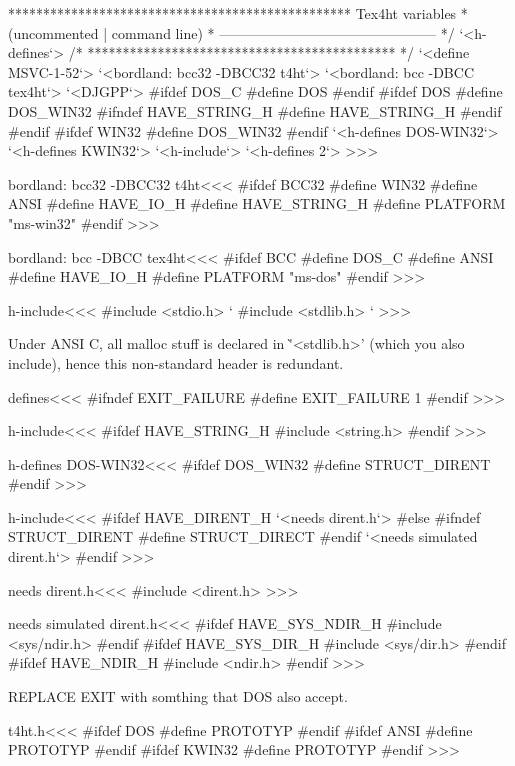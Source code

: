 {*************************************************
    Tex4ht variables                            *
    (uncommented | command line)                *
----------------------------------------------- */
`<h-defines`>
/* ******************************************** */
`<define MSVC-1-52`>
`<bordland: bcc32 -DBCC32 t4ht`>
`<bordland: bcc -DBCC tex4ht`>
`<DJGPP`>
#ifdef DOS_C
#define DOS
#endif
#ifdef DOS
#define DOS_WIN32
#ifndef HAVE_STRING_H
#define HAVE_STRING_H
#endif
#endif
#ifdef WIN32
#define DOS_WIN32
#endif
`<h-defines DOS-WIN32`>
`<h-defines KWIN32`>
`<h-include`>
`<h-defines 2`>
>>>


\<bordland: bcc32 -DBCC32 t4ht\><<<
#ifdef BCC32
#define WIN32 
#define ANSI       
#define HAVE_IO_H
#define HAVE_STRING_H
#define PLATFORM "ms-win32"
#endif
>>>

% 

\<bordland: bcc -DBCC tex4ht\><<<
#ifdef BCC
#define DOS_C
#define ANSI       
#define HAVE_IO_H
#define PLATFORM "ms-dos"
#endif
>>>


\<h-include\><<<
#include <stdio.h>   `%
#include <stdlib.h>  `%
>>>



  Under ANSI C, all malloc stuff is declared in \`'<stdlib.h>' (which you
also include), hence this non-standard header is redundant.



\<defines\><<<
#ifndef EXIT_FAILURE
#define EXIT_FAILURE 1
#endif
>>>

\<h-include\><<<
#ifdef HAVE_STRING_H
#include <string.h>
#endif
>>>




\<h-defines DOS-WIN32\><<<
#ifdef DOS_WIN32
#define STRUCT_DIRENT
#endif
>>>


\<h-include\><<<
#ifdef HAVE_DIRENT_H
`<needs dirent.h`>
#else
#ifndef STRUCT_DIRENT
#define STRUCT_DIRECT
#endif
`<needs simulated dirent.h`>
#endif 
>>>



\<needs dirent.h\><<<
#include <dirent.h>
>>>


\<needs simulated dirent.h\><<<
#ifdef HAVE_SYS_NDIR_H
#include <sys/ndir.h>
#endif
#ifdef HAVE_SYS_DIR_H
#include <sys/dir.h>
#endif
#ifdef HAVE_NDIR_H
#include <ndir.h>
#endif
>>>


REPLACE EXIT with somthing that DOS also accept.




\<t4ht.h\><<<
#ifdef DOS
#define PROTOTYP
#endif
#ifdef ANSI
#define PROTOTYP
#endif
#ifdef KWIN32
#define PROTOTYP
#endif
>>>

}
